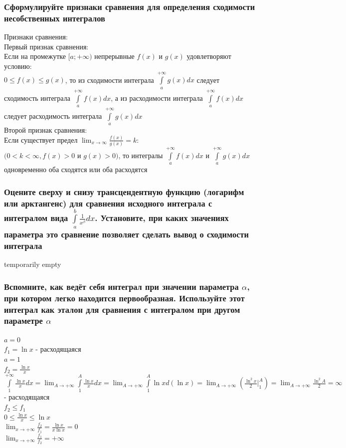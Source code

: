 \documentclass{article}
\begin{document}
\subsubsection{Сформулируйте признаки сравнения для определения сходимости несобственных интегралов}
Признаки сравнения:\\
Первый признак сравнения:\\
Если на промежутке $ [a; +\infty) $ непрерывные $ f(x) $ и $ g(x) $ удовлетворяют условию:\\
$ 0 \le f(x) \le g(x) $, то из сходимости интеграла $ \int\limits^{+\infty}_{a} g(x)dx $ следует сходимость интеграла $ \int\limits^{+\infty}_{a} f(x)dx $, а из расходимости интеграла $ \int\limits^{+\infty}_{a} f(x)dx $ следует расходимость интеграла $ \int\limits^{+\infty}_{a} g(x)dx $\\
Второй признак сравнения:\\
Если существует предел $ \lim_{x\to \infty} \frac{f(x)}{g(x)} = k $:\\
$ (0 < k < \infty, f(x) > 0 $ и $ g(x) > 0) $, то интегралы $ \int\limits^{+\infty}_{a} f(x)dx $ и $ \int\limits^{+\infty}_{a} g(x)dx $ одновременно оба сходятся или оба расходятся
\subsubsection{Оцените сверху и снизу трансцендентную функцию (логарифм или арктангенс) для сравнения исходного интеграла с интегралом вида $ \int\limits^b_a \frac{1}{x^{\beta}}dx $. Установите, при каких значениях параметра это сравнение позволяет сделать вывод о сходимости интеграла}
temporarily empty
\subsubsection{Вспомните, как ведёт себя интеграл при значении параметра $ \alpha $, при котором легко находится первообразная. Используйте этот интеграл как эталон для сравнения с интегралом при другом параметре $ \alpha $}
$ a = 0 $\\
$ f_1 = \ln{x} $ - расходящаяся\\
$ a = 1 $\\
$ f_2 = \frac{\ln{x}}{x} $\\
$ \int\limits^{+\infty}_1 \frac{\ln{x}}{x}dx = \lim_{A\to +\infty} \int\limits^A_1 \frac{\ln{x}}{x}dx = \lim_{A\to +\infty} \int\limits^A_1 \ln{x}d(\ln{x}) = \lim_{A\to +\infty} (\frac{\ln^2{x}}{2} |^A_1) = \lim_{A\to +\infty} \frac{\ln^2{A}}{2} = \infty $ - расходящаяся\\
$ f_2 \le f_1 $\\
$ 0 \le \frac{\ln{x}}{x} \le \ln{x} $\\
$ \lim_{x\to +\infty} \frac{f_2}{f_1} = \frac{\ln{x}}{x\ln{x}} = 0 $\\
$ \lim_{x\to +\infty} \frac{f_1}{f_2} = +\infty $
\end{document}
